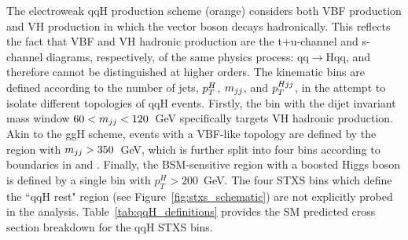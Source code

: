 %     

The electroweak qqH production scheme (orange) considers both VBF production and VH production in which the vector boson decays hadronically. This reflects the fact that VBF and VH hadronic production are the t+u-channel and s-channel diagrams, respectively, of the same physics process: qq$\rightarrow$Hqq, and therefore cannot be distinguished at higher orders. The kinematic bins are defined according to the number of jets, $p_T^H$, $m_{jj}$, and $p_T^{Hjj}$, in the attempt to isolate different topologies of qqH events. Firstly, the bin with the dijet invariant mass window $60<m_{jj}<120$~GeV specifically targets VH hadronic production. Akin to the ggH scheme, events with a VBF-like topology are defined by the region with $m_{jj}>350$~GeV, which is further split into four bins according to boundaries in \mjj and \ptHjj. Finally, the BSM-sensitive region with a boosted Higgs boson is defined by a single bin with $p_T^H>200$~GeV. The four STXS bins which define the ``qqH rest" region (see Figure~\ref{fig:stxs_schematic}) are not explicitly probed in the \Hgg analysis. Table~\ref{tab:qqH_definitions} provides the SM predicted cross section breakdown for the qqH STXS bins.

